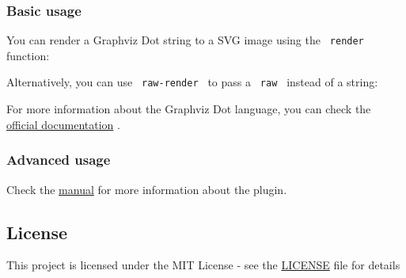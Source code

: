 \subsubsection{Basic usage}\label{basic-usage}

You can render a Graphviz Dot string to a SVG image using the
\texttt{\ render\ } function:

\begin{Shaded}
\begin{Highlighting}[]
\end{Highlighting}
\end{Shaded}

Alternatively, you can use \texttt{\ raw-render\ } to pass a
\texttt{\ raw\ } instead of a string:

\begin{Shaded}
\begin{Highlighting}[]
\NormalTok{  \}}
\NormalTok{  \textasciigrave{}\textasciigrave{}\textasciigrave{}}
\NormalTok{)}
\end{Highlighting}
\end{Shaded}


For more information about the Graphviz Dot language, you can check the
\href{https://graphviz.org/documentation/}{official documentation} .

\subsubsection{Advanced usage}\label{advanced-usage}

Check the
\href{https://raw.githubusercontent.com/Robotechnic/diagraph/main/doc/manual.pdf}{manual}
for more information about the plugin.

\subsection{License}\label{license}

This project is licensed under the MIT License - see the
\href{https://github.com/typst/packages/raw/main/packages/preview/diagraph/0.3.0/LICENSE}{LICENSE}
file for details

